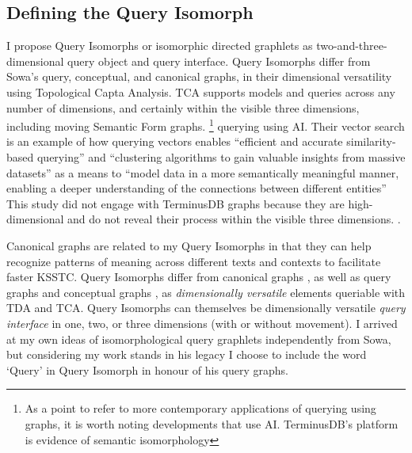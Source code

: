 \subsection{Defining the Query Isomorph}

I propose Query Isomorphs or isomorphic directed graphlets as two-and-three-dimensional query object and query interface. Query Isomorphs differ from Sowa's query, conceptual, and canonical graphs, in their dimensional versatility using Topological Capta Analysis. TCA supports models and queries across any number of dimensions, and certainly within the visible three dimensions, including moving Semantic Form graphs. \footnote{As a point to refer to more contemporary applications of querying using graphs, it is worth noting developments that use AI. TerminusDB’s platform is evidence of semantic isomorphology} querying using AI. Their vector search is an example of how querying vectors enables “efficient and accurate similarity-based querying” and “clustering algorithms to gain valuable insights from massive datasets” as a means to “model data in a more semantically meaningful manner, enabling a deeper understanding of the connections between different entities” This study did not engage with TerminusDB graphs because they are high-dimensional and do not reveal their process within the visible three dimensions. \citep{terminusdb_enterprise_2023}.

Canonical graphs \citep[p. 53]{sowa_semantics_2013} are related to my Query Isomorphs in that they can help recognize patterns of meaning across different texts and contexts to facilitate faster KSSTC. Query Isomorphs differ from canonical graphs  \citep[p. 53]{sowa_semantics_2013}, as well as query graphs \citep[p. 313]{sowa_conceptual_1984} and conceptual graphs \citep[p. 53]{sowa_semantics_2013}, as \textit{dimensionally versatile} elements queriable with TDA and TCA. Query Isomorphs can themselves be dimensionally versatile \textit{query interface} in one, two, or three dimensions (with or without movement). I arrived at my own ideas of isomorphological query graphlets independently from Sowa, but considering my work stands in his legacy I choose to include the word ‘Query’ in Query Isomorph in honour of his query graphs. 

